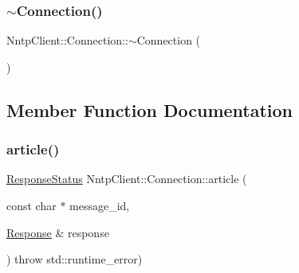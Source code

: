 \hypertarget{class_nntp_client_1_1_connection_acc2047fde3c627a15501db0039d9d7e3}{}\label{class_nntp_client_1_1_connection_acc2047fde3c627a15501db0039d9d7e3} 
\subsubsection{\texorpdfstring{$\sim$\+Connection()}{~Connection()}}
{\footnotesize\ttfamily Nntp\+Client\+::\+Connection\+::$\sim$\+Connection (\begin{DoxyParamCaption}{ }\end{DoxyParamCaption})\hspace{0.3cm}{\ttfamily [virtual]}}



\subsection{Member Function Documentation}
\hypertarget{class_nntp_client_1_1_connection_a778194b662ca3954ef00122a8f7beb82}{}\label{class_nntp_client_1_1_connection_a778194b662ca3954ef00122a8f7beb82} 
\subsubsection{\texorpdfstring{article()}{article()}}
{\footnotesize\ttfamily \hyperlink{namespace_nntp_client_a920c73a4038b2a2c307245b909b43203}{Response\+Status} Nntp\+Client\+::\+Connection\+::article (\begin{DoxyParamCaption}\item[{const char $\ast$}]{message\+\_\+id,  }\item[{\hyperlink{class_nntp_client_1_1_response}{Response} \&}]{response }\end{DoxyParamCaption}) throw  std\+::runtime\+\_\+error) }

\hypertarget{class_nntp_client_1_1_connection_a877aa852a68915e0ecf82cd147c0b451}{}\label{class_nntp_client_1_1_connection_a877aa852a68915e0ecf82cd147c0b451} 
